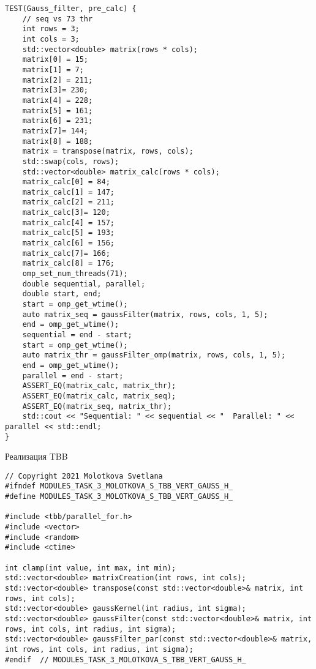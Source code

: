 \documentclass{report}
\begin{document}
\begin{lstlisting}
TEST(Gauss_filter, pre_calc) {
	// seq vs 73 thr
	int rows = 3;
	int cols = 3;
	std::vector<double> matrix(rows * cols);
	matrix[0] = 15;
	matrix[1] = 7;
	matrix[2] = 211;
	matrix[3]= 230;
	matrix[4] = 228;
	matrix[5] = 161;
	matrix[6] = 231;
	matrix[7]= 144;
	matrix[8] = 188;
	matrix = transpose(matrix, rows, cols);
	std::swap(cols, rows);
	std::vector<double> matrix_calc(rows * cols);
	matrix_calc[0] = 84;
	matrix_calc[1] = 147;
	matrix_calc[2] = 211;
	matrix_calc[3]= 120;
	matrix_calc[4] = 157;
	matrix_calc[5] = 193;
	matrix_calc[6] = 156;
	matrix_calc[7]= 166;
	matrix_calc[8] = 176;
	omp_set_num_threads(71);
	double sequential, parallel;
	double start, end;
	start = omp_get_wtime();
	auto matrix_seq = gaussFilter(matrix, rows, cols, 1, 5);
	end = omp_get_wtime();
	sequential = end - start;
	start = omp_get_wtime();
	auto matrix_thr = gaussFilter_omp(matrix, rows, cols, 1, 5);
	end = omp_get_wtime();
	parallel = end - start;
	ASSERT_EQ(matrix_calc, matrix_thr);
	ASSERT_EQ(matrix_calc, matrix_seq);
	ASSERT_EQ(matrix_seq, matrix_thr);
	std::cout << "Sequential: " << sequential << "  Parallel: " << parallel << std::endl;
}

\end{lstlisting}
Реализация TBB
\begin{lstlisting}
// Copyright 2021 Molotkova Svetlana
#ifndef MODULES_TASK_3_MOLOTKOVA_S_TBB_VERT_GAUSS_H_
#define MODULES_TASK_3_MOLOTKOVA_S_TBB_VERT_GAUSS_H_

#include <tbb/parallel_for.h>
#include <vector>
#include <random>
#include <ctime>

int clamp(int value, int max, int min);
std::vector<double> matrixCreation(int rows, int cols);
std::vector<double> transpose(const std::vector<double>& matrix, int rows, int cols);
std::vector<double> gaussKernel(int radius, int sigma);
std::vector<double> gaussFilter(const std::vector<double>& matrix, int rows, int cols, int radius, int sigma);
std::vector<double> gaussFilter_par(const std::vector<double>& matrix, int rows, int cols, int radius, int sigma);
#endif  // MODULES_TASK_3_MOLOTKOVA_S_TBB_VERT_GAUSS_H_

\end{lstlisting}
\end{document}
